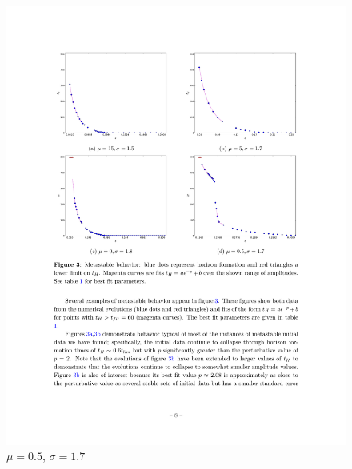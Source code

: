 \documentclass[mathserif,10pt]{beamer}
\begin{document}
{\begin{columns}
\begin{figure}
    \includegraphics[scale=0.75]{m05w17} \\ $\mu = 0.5$, $\sigma = 1.7$
    \end{figure}
  \end{columns}
}
\end{document}
